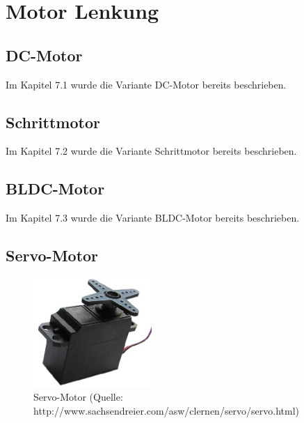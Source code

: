 
\section{Motor Lenkung}


\subsection{DC-Motor}

Im Kapitel 7.1 wurde die Variante DC-Motor bereits beschrieben.


\subsection{Schrittmotor}
Im Kapitel 7.2 wurde die Variante Schrittmotor bereits beschrieben.

\subsection{BLDC-Motor}
Im Kapitel 7.3 wurde die Variante BLDC-Motor bereits beschrieben.

\subsection{Servo-Motor}

\begin{figure}[h!]%
\centering
\includegraphics[width=0.4\textwidth]{fig/servo.jpg}
\caption{Servo-Motor (Quelle: http://www.sachsendreier.com/asw/clernen/servo/servo.html)}
\label{fig:Java}
\end{figure}

